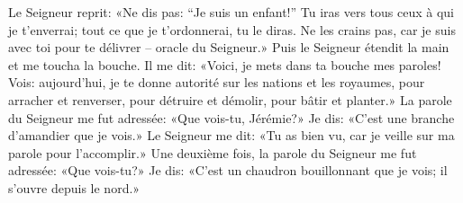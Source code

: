 Le Seigneur reprit: «Ne dis pas: “Je suis un enfant!”
	Tu iras vers tous ceux à qui je t’enverrai;
	tout ce que je t’ordonnerai, tu le diras.
Ne les crains pas, car je suis avec toi pour te délivrer – oracle du Seigneur.»
Puis le Seigneur étendit la main et me toucha la bouche.
Il me dit:
	«Voici, je mets dans ta bouche mes paroles!
	Vois: aujourd’hui, je te donne autorité sur les nations et les royaumes,
	pour arracher et renverser, pour détruire et démolir,
		pour bâtir et planter.»
La parole du Seigneur me fut adressée:
	«Que vois-tu, Jérémie?»
	Je dis: «C’est une branche d’amandier que je vois.»
Le Seigneur me dit:
	«Tu as bien vu, car je veille sur ma parole pour l’accomplir.»
Une deuxième fois, la parole du Seigneur me fut adressée:
	«Que vois-tu?»
	Je dis: «C’est un chaudron bouillonnant que je vois;
	il s’ouvre depuis le nord.»
